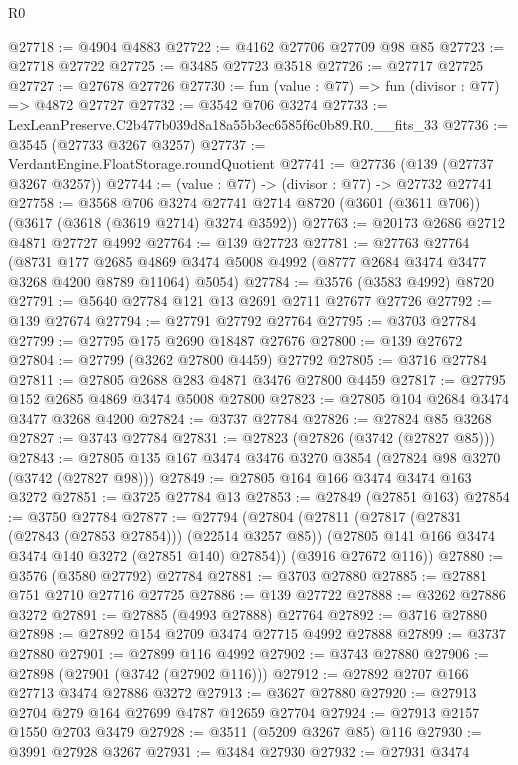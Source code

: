 \begin{lexlean}{R0}
\begin{coremodule}
@27718 := @4904 @4883
@27722 := @4162 @27706 @27709 @98 @85
@27723 := @27718 @27722
@27725 := @3485 @27723 @3518
@27726 := @27717 @27725
@27727 := @27678 @27726
@27730 := fun (value : @77) => fun (divisor : @77) => @4872 @27727
@27732 := @3542 @706 @3274
@27733 := LexLeanPreserve.C2b477b039d8a18a55b3ec6585f6c0b89.R0.__fits_33
@27736 := @3545 (@27733 @3267 @3257)
@27737 := VerdantEngine.FloatStorage.roundQuotient
@27741 := @27736 (@139 (@27737 @3267 @3257))
@27744 := (value : @77) -> (divisor : @77) -> @27732 @27741
@27758 := @3568
    @706
    @3274
    @27741
    @2714
    @8720
    (@3601 (@3611 @706))
    (@3617 (@3618 (@3619 @2714) @3274 @3592))
@27763 := @20173 @2686 @2712 @4871 @27727 @4992
@27764 := @139 @27723
@27781 := @27763
    @27764
    (@8731
      @177
      @2685
      @4869
      @3474
      @5008
      @4992
      (@8777 @2684 @3474 @3477 @3268 @4200 @8789 @11064)
      @5054)
@27784 := @3576 (@3583 @4992) @8720
@27791 := @5640 @27784 @121 @13 @2691 @2711 @27677 @27726
@27792 := @139 @27674
@27794 := @27791 @27792 @27764
@27795 := @3703 @27784
@27799 := @27795 @175 @2690 @18487 @27676
@27800 := @139 @27672
@27804 := @27799 (@3262 @27800 @4459) @27792
@27805 := @3716 @27784
@27811 := @27805 @2688 @283 @4871 @3476 @27800 @4459
@27817 := @27795 @152 @2685 @4869 @3474 @5008 @27800
@27823 := @27805 @104 @2684 @3474 @3477 @3268 @4200
@27824 := @3737 @27784
@27826 := @27824 @85 @3268
@27827 := @3743 @27784
@27831 := @27823 (@27826 (@3742 (@27827 @85)))
@27843 := @27805 @135 @167 @3474 @3476 @3270 @3854 (@27824 @98 @3270 (@3742 (@27827 @98)))
@27849 := @27805 @164 @166 @3474 @3474 @163 @3272
@27851 := @3725 @27784 @13
@27853 := @27849 (@27851 @163)
@27854 := @3750 @27784
@27877 := @27794
    (@27804
      (@27811
        (@27817 (@27831 (@27843 (@27853 @27854))) (@22514 @3257 @85))
        (@27805 @141 @166 @3474 @3474 @140 @3272 (@27851 @140) @27854))
      (@3916 @27672 @116))
@27880 := @3576 (@3580 @27792) @27784
@27881 := @3703 @27880
@27885 := @27881 @751 @2710 @27716 @27725
@27886 := @139 @27722
@27888 := @3262 @27886 @3272
@27891 := @27885 (@4993 @27888) @27764
@27892 := @3716 @27880
@27898 := @27892 @154 @2709 @3474 @27715 @4992 @27888
@27899 := @3737 @27880
@27901 := @27899 @116 @4992
@27902 := @3743 @27880
@27906 := @27898 (@27901 (@3742 (@27902 @116)))
@27912 := @27892 @2707 @166 @27713 @3474 @27886 @3272
@27913 := @3627 @27880
@27920 := @27913 @2704 @279 @164 @27699 @4787 @12659 @27704
@27924 := @27913 @2157 @1550 @2703 @3479
@27928 := @3511 (@5209 @3267 @85) @116
@27930 := @3991 @27928 @3267
@27931 := @3484 @27930
@27932 := @27931 @3474

\end{coremodule}
\end{lexlean}
